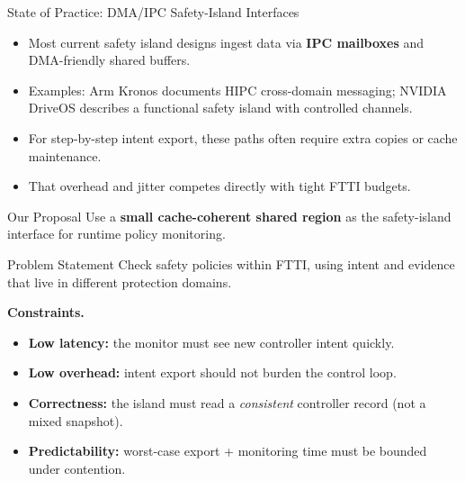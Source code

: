 \documentclass[aspectratio=169,12pt]{beamer}
\newcommand{\hl}[1]{\textcolor{Accent}{\textbf{#1}}}
\newcommand{\keyword}[1]{\textcolor{MidBlue}{\textbf{#1}}}
\newcommand{\SafetyIsland}{safety island\xspace}
\newcommand{\FTTI}{FTTI\xspace}
\begin{document}
\begin{frame}{State of Practice: DMA/IPC Safety-Island Interfaces}
\begin{itemize}
\item Most current \SafetyIsland designs ingest data via \hl{IPC mailboxes} and DMA-friendly shared buffers.
\item Examples: Arm Kronos documents HIPC cross-domain messaging; NVIDIA DriveOS describes a functional safety island with controlled channels.
\item For step-by-step intent export, these paths often require extra copies or cache maintenance.
\item That overhead and jitter competes directly with tight \FTTI budgets.
\end{itemize}

\vspace{0.4em}
\begin{block}{Our Proposal}
Use a \hl{small cache-coherent shared region} as the safety-island interface for runtime policy monitoring.
\end{block}
\end{frame}

\begin{frame}{Problem Statement}
Check safety policies within \FTTI, using intent and evidence that live in different protection domains.

\vspace{0.6em}
\textbf{Constraints.}
\begin{itemize}
\item \keyword{Low latency:} the monitor must see new controller intent quickly.
\item \keyword{Low overhead:} intent export should not burden the control loop.
\item \keyword{Correctness:} the island must read a \emph{consistent} controller record (not a mixed snapshot).
\item \keyword{Predictability:} worst-case export + monitoring time must be bounded under contention.
\end{itemize}
\end{frame}
\end{document}

